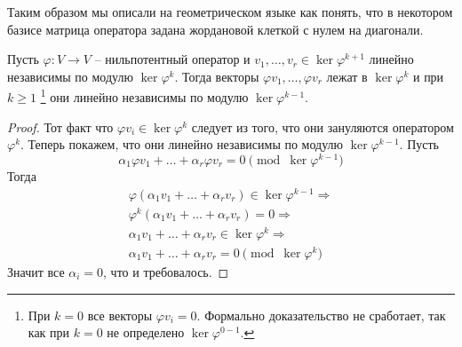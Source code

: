 Таким образом мы описали на геометрическом языке как понять, что в некотором базисе матрица оператора задана жордановой клеткой с нулем на диагонали.

\begin{claim}
\label{claim::LinIndepModKer}
Пусть $\varphi\colon V\to V$ -- нильпотентный оператор и $v_1,\ldots,v_r\in \ker \varphi^{k+1}$ линейно независимы по модулю $\ker \varphi^k$.
Тогда векторы $\varphi v_1,\ldots,\varphi v_r$ лежат в $\ker \varphi^k$ и при $k \geqslant 1$%
\footnote{При $k = 0$ все векторы $\varphi v_i = 0$.
Формально доказательство не сработает, так как при $k = 0$ не определено $\ker \varphi^{0 - 1}$.}
они линейно независимы по модулю $\ker \varphi^{k-1}$.
\end{claim}
\begin{proof}
Тот факт что $\varphi v_i\in \ker \varphi^{k}$ следует из того, что они зануляются оператором $\varphi^k$.
Теперь покажем, что они линейно независимы по модулю $\ker \varphi^{k-1}$.
Пусть 
\[
\alpha_1 \varphi v_1 + \ldots + \alpha_r \varphi v_r = 0 \pmod{\ker \varphi^{k-1}}
\]
Тогда
\begin{gather*}
\varphi(\alpha_1 v_1 + \ldots + \alpha_r v_r)\in \ker \varphi^{k-1}\Rightarrow\\
\varphi^k(\alpha_1 v_1 + \ldots + \alpha_r v_r) = 0\Rightarrow\\
\alpha_1v_1 +\ldots + \alpha_r v_r \in \ker\varphi^k\Rightarrow\\
\alpha_1 v_1 + \ldots + \alpha_r v_r = 0 \pmod{\ker \varphi^k}
\end{gather*}
Значит все $\alpha_i = 0$, что и требовалось.
\end{proof}

